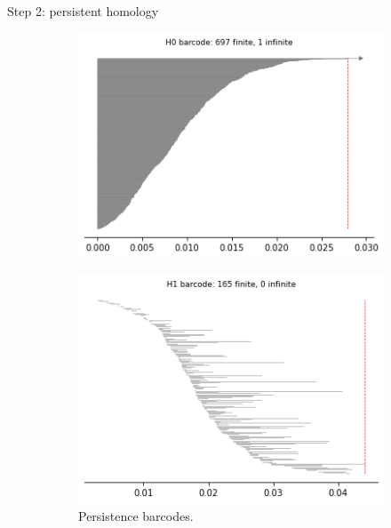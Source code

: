 \documentclass[xcolor={dvipsnames,svgnames}]{beamer}
\begin{document}
\begin{frame}{Step 2: persistent homology}
\begin{figure}[H]
\begin{subfigure}[b]{0.25\textwidth}
\end{subfigure}
\begin{subfigure}[b]{0.2\textwidth}
    \includegraphics[width=\textwidth]{figures/X2_H0_barcode.png}
    \caption{}
\end{subfigure}
\begin{subfigure}[b]{0.2\textwidth}
    \includegraphics[width=\textwidth]{figures/X2_H1_barcode.png}
        \caption{Persistence barcodes.}
\end{subfigure}
\begin{subfigure}[b]{0.2\textwidth}

\end{subfigure}
\end{figure}
\end{frame}
\end{document}
